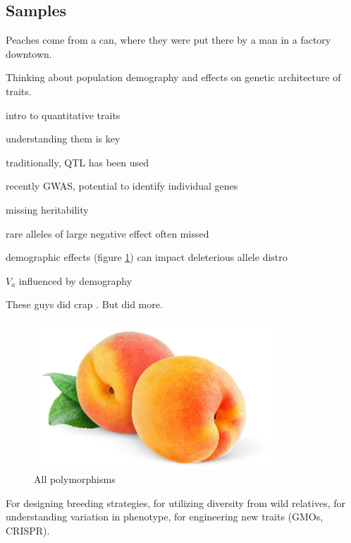 \documentclass[12pt]{article}
\begin{document}
\subsection*{Samples}
Peaches come from a can, where they were put there by a man in a factory downtown.

Thinking about population demography and effects on genetic architecture of traits.

intro to quantitative traits

 understanding them is key

 traditionally, QTL has been used

 recently GWAS, potential to identify individual genes

 missing heritability

rare alleles of large negative effect often missed \citep{Thornton2013}


demographic effects (figure \ref{fig:pairwise}) can impact deleterious allele distro

$V_a$ influenced by demography \citep{Lohmueller2014}


These guys did crap \citep{Gazave2013}.
But \citet{Thornton2014} did more.


\begin{figure}[b]
\centering
   \includegraphics[width=0.8\textwidth]{peachzdfgad.jpg}
  \caption{All polymorphisms}
  \label{fig:pairwise}
\end{figure}%


For designing breeding strategies, for utilizing diversity from wild relatives, for understanding variation in phenotype, for engineering new traits (GMOs, CRISPR).





\end{document}
